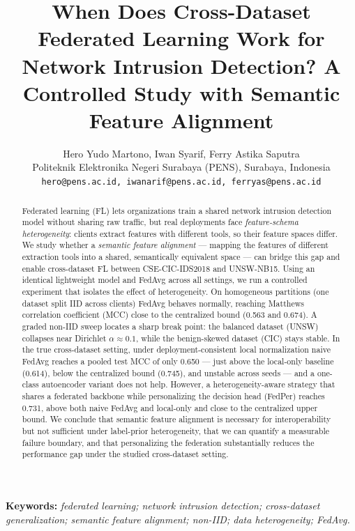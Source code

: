 \documentclass[11pt,a4paper]{article}
\title{\textbf{When Does Cross-Dataset Federated Learning Work for Network
Intrusion Detection? A Controlled Study with Semantic Feature Alignment}}
\author{Hero Yudo Martono, Iwan Syarif, Ferry Astika Saputra\\
\small Politeknik Elektronika Negeri Surabaya (PENS), Surabaya, Indonesia\\
\small \texttt{hero@pens.ac.id, iwanarif@pens.ac.id, ferryas@pens.ac.id}}
\date{}
\begin{document}
\maketitle

\begin{abstract}
\noindent
Federated learning (FL) lets organizations train a shared network intrusion
detection model without sharing raw traffic, but real deployments face
\emph{feature-schema heterogeneity}: clients extract features with different
tools, so their feature spaces differ. We study whether a
\emph{semantic feature alignment} --- mapping the features of different extraction
tools into a shared, semantically equivalent space --- can bridge this gap and
enable cross-dataset FL
between CSE-CIC-IDS2018 and UNSW-NB15. Using an identical lightweight model and
FedAvg across all settings, we run a controlled experiment that isolates the
effect of heterogeneity. On homogeneous partitions (one dataset split IID across
clients) FedAvg behaves normally, reaching Matthews correlation coefficient (MCC)
close to the centralized bound (0.563 and 0.674). A graded non-IID sweep locates a
sharp break point: the balanced dataset (UNSW) collapses near Dirichlet
\(\alpha\approx0.1\), while the benign-skewed dataset (CIC) stays stable. In the
true cross-dataset setting, under deployment-consistent local normalization naive
FedAvg reaches a pooled test MCC of only 0.650 --- just above the local-only
baseline (0.614), below the centralized bound (0.745), and unstable across seeds
--- and a one-class autoencoder variant does not help. However, a
heterogeneity-aware strategy that shares a federated backbone while personalizing
the decision head (FedPer) reaches 0.731, above both naive FedAvg and local-only
and close to the centralized upper bound. We conclude that semantic feature
alignment is necessary
for interoperability but not sufficient under label-prior heterogeneity, that we
can quantify a measurable failure boundary, and that personalizing the federation
substantially reduces the performance gap under the studied cross-dataset setting.
\end{abstract}

\noindent\textbf{Keywords:} \emph{federated learning; network intrusion
detection; cross-dataset generalization; semantic feature alignment; non-IID;
data heterogeneity; FedAvg.}

\vspace{1em}

\end{document}
